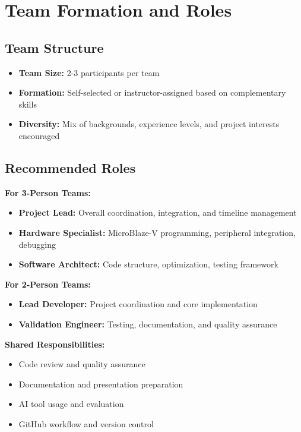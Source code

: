 \documentclass[11pt,a4paper]{article}
\begin{document}
\section{Team Formation and Roles}

\subsection{Team Structure}
\begin{itemize}
    \item \textbf{Team Size:} 2-3 participants per team
    \item \textbf{Formation:} Self-selected or instructor-assigned based on complementary skills
    \item \textbf{Diversity:} Mix of backgrounds, experience levels, and project interests encouraged
\end{itemize}

\subsection{Recommended Roles}
\textbf{For 3-Person Teams:}
\begin{itemize}
    \item \textbf{Project Lead:} Overall coordination, integration, and timeline management
    \item \textbf{Hardware Specialist:} MicroBlaze-V programming, peripheral integration, debugging
    \item \textbf{Software Architect:} Code structure, optimization, testing framework
\end{itemize}

\textbf{For 2-Person Teams:}
\begin{itemize}
    \item \textbf{Lead Developer:} Project coordination and core implementation
    \item \textbf{Validation Engineer:} Testing, documentation, and quality assurance
\end{itemize}

\textbf{Shared Responsibilities:}
\begin{itemize}
    \item Code review and quality assurance
    \item Documentation and presentation preparation
    \item AI tool usage and evaluation
    \item GitHub workflow and version control
\end{itemize}
\end{document}
